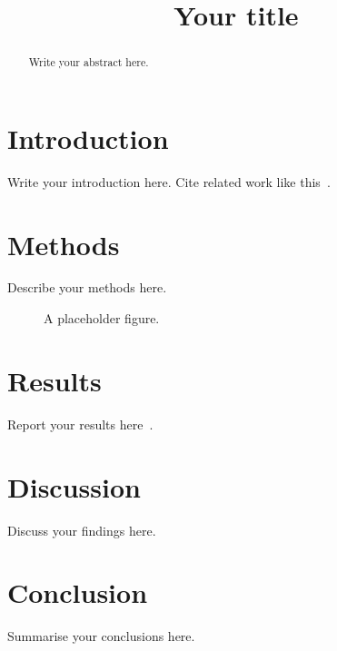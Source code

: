 \documentclass[conference]{IEEEtran}
\title{Your title}
\author{\IEEEauthorblockN{Your name}\IEEEauthorblockA{Your institution}}
\begin{document}
\maketitle
\begin{abstract}
Write your abstract here.
\end{abstract}

\section{Introduction}
Write your introduction here. Cite related work like this~\citep{smith2021deep}.

\section{Methods}
Describe your methods here.

\begin{figure}[h]
  \centering
  \caption{A placeholder figure.}
\end{figure}

\section{Results}
Report your results here~\citep{lee2020graph}.

\section{Discussion}
Discuss your findings here.

\section{Conclusion}
Summarise your conclusions here.



\end{document}
